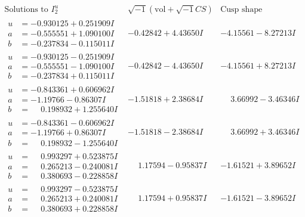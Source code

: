 \documentclass[1p]{elsarticle_modified}
\theoremstyle{definition}
\newcommand{\I}{\sqrt{-1}}
\begin{document}
$$\begin{array}{c|c|c}  
\text{Solutions to }I^u_{2}& \I (\text{vol} + \sqrt{-1}CS) & \text{Cusp shape}\\
 \hline 
\begin{aligned}
u &= -0.930125 + 0.251909 I \\
a &= -0.555551 + 1.090100 I \\
b &= -0.237834 - 0.115011 I\end{aligned}
 & -0.42842 + 4.43650 I & -4.15561 - 8.27213 I \\ \hline\begin{aligned}
u &= -0.930125 - 0.251909 I \\
a &= -0.555551 - 1.090100 I \\
b &= -0.237834 + 0.115011 I\end{aligned}
 & -0.42842 - 4.43650 I & -4.15561 + 8.27213 I \\ \hline\begin{aligned}
u &= -0.843361 + 0.606962 I \\
a &= -1.19766 - 0.86307 I \\
b &= \phantom{-}0.198932 + 1.255640 I\end{aligned}
 & -1.51818 + 2.38684 I & \phantom{-}3.66992 - 3.46346 I \\ \hline\begin{aligned}
u &= -0.843361 - 0.606962 I \\
a &= -1.19766 + 0.86307 I \\
b &= \phantom{-}0.198932 - 1.255640 I\end{aligned}
 & -1.51818 - 2.38684 I & \phantom{-}3.66992 + 3.46346 I \\ \hline\begin{aligned}
u &= \phantom{-}0.993297 + 0.523875 I \\
a &= \phantom{-}0.265213 - 0.240081 I \\
b &= \phantom{-}0.380693 - 0.228858 I\end{aligned}
 & \phantom{-}1.17594 - 0.95837 I & -1.61521 + 3.89652 I \\ \hline\begin{aligned}
u &= \phantom{-}0.993297 - 0.523875 I \\
a &= \phantom{-}0.265213 + 0.240081 I \\
b &= \phantom{-}0.380693 + 0.228858 I\end{aligned}
 & \phantom{-}1.17594 + 0.95837 I & -1.61521 - 3.89652 I \\ \hline\begin{aligned}

\end{aligned}
\end{array}$$
\end{document}
